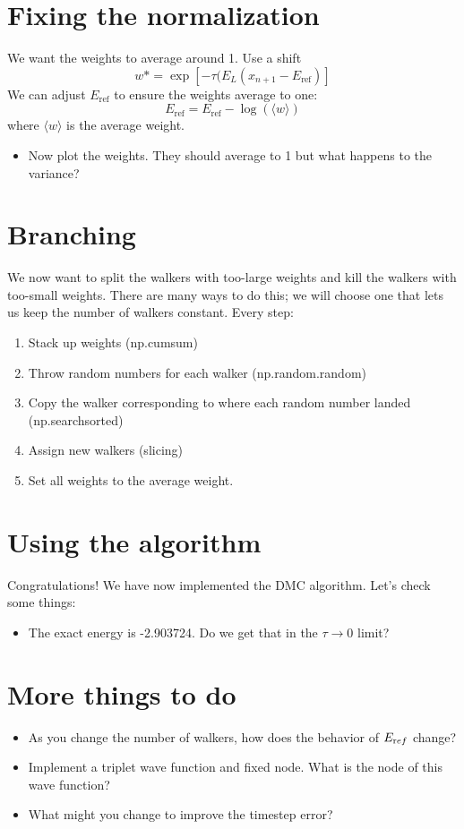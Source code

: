 \documentclass[12pt]{article}
\begin{document}
\section{Fixing the normalization}

We want the weights to average around 1.
Use a shift 
\begin{equation}
w*=	\exp[-\tau (E_L(x_{n+1}-E_{\text{ref}})] 
\end{equation}
We can adjust $E_{\text {ref}}$ to ensure the weights average to one:
\begin{equation}
E_{\text{ref}}=E_{\text{ref}}-\log(\langle w \rangle) 
\end{equation}
where $\langle w \rangle$ is the average weight. 

\begin{itemize}
\item Now plot the weights. They should average to 1 but what happens to the variance?
\end{itemize}

\section{Branching} 

We now want to split the walkers with too-large weights and kill the walkers with too-small weights. 
There are many ways to do this; we will choose one that lets us keep the number of walkers constant. 
Every step:
\begin{enumerate}
\item Stack up weights (np.cumsum)
\item Throw random numbers for each walker (np.random.random)
\item Copy the walker corresponding to where each random number landed (np.searchsorted)
\item Assign new walkers (slicing)
\item Set all weights to the average weight.
\end{enumerate}
\section{Using the algorithm}
Congratulations! We have now implemented the DMC algorithm. 
Let's check some things:

\begin{itemize}
\item The exact energy is -2.903724. Do we get that in the $\tau\rightarrow0$ limit?
\end{itemize}

\section{More things to do}
\begin{itemize}
\item As you change the number of walkers, how does the behavior of $E_{\text ref}$ change?
\item Implement a triplet wave function and fixed node. What is the node of this wave function?
\item What might you change to improve the timestep error? 
\end{itemize}
\end{document}
